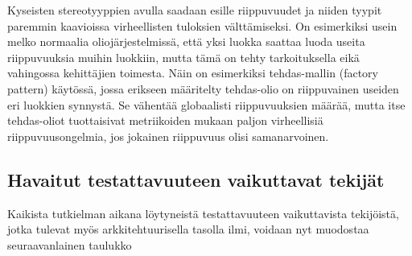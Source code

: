 \documentclass[finnish]{tktltiki2}
\numberwithin{table}{section}
\theoremstyle{definition}
\theoremstyle{remark}
\begin{document}
\noindent
Kyseisten stereotyyppien avulla saadaan esille riippuvuudet ja niiden tyypit paremmin kaavioissa virheellisten tuloksien välttämiseksi. On esimerkiksi usein melko normaalia oliojärjestelmissä, että yksi luokka saattaa luoda useita riippuvuuksia muihin luokkiin, mutta tämä on tehty tarkoituksella eikä vahingossa kehittäjien toimesta. Näin on esimerkiksi tehdas-mallin (factory pattern) käytössä, jossa erikseen määritelty tehdas-olio on riippuvainen useiden eri luokkien synnystä. Se vähentää globaalisti riippuvuuksien määrää, mutta itse tehdas-oliot tuottaisivat metriikoiden mukaan paljon virheellisiä riippuvuusongelmia, jos jokainen riippuvuus olisi samanarvoinen.








\subsection{Havaitut testattavuuteen vaikuttavat tekijät}

Kaikista tutkielman aikana löytyneistä testattavuuteen vaikuttavista tekijöistä, jotka tulevat myös arkkitehtuurisella tasolla ilmi, voidaan nyt muodostaa seuraavanlainen taulukko
\end{document}
